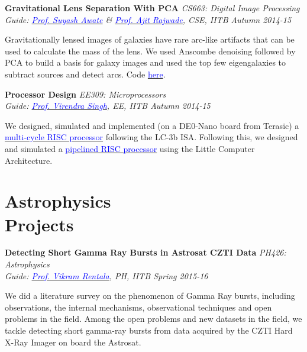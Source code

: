 \documentclass[margin,line]{res}
\newenvironment{list1}{
  \begin{list}{\ding{113}}{%
      \setlength{\itemsep}{0in}
      \setlength{\parsep}{0in} \setlength{\parskip}{0in}
      \setlength{\topsep}{0in} \setlength{\partopsep}{0in} 
      \setlength{\leftmargin}{0.17in}}}{\end{list}}
\begin{document}
\begin{resume}
\vspace*{-0.1in}

{\bf Gravitational Lens Separation With PCA} \hfill \textit{CS663: Digital Image Processing} \\
{\em Guide: \href{https://www.cse.iitb.ac.in/~suyash}{\textcolor{blue}{Prof. Suyash Awate}} \& \href{https://www.cse.iitb.ac.in/~ajitvr}{\textcolor{blue}{Prof. Ajit Rajwade}}, CSE, IITB \hfill Autumn 2014-15} \\
\vspace*{-.15in}
\begin{list1}
\item[] Gravitationally lensed images of galaxies have rare arc-like artifacts that can be used to calculate the mass of the lens. We used Anscombe denoising followed by PCA to build a basis for galaxy images and used the top few eigengalaxies to subtract sources and detect arcs. Code \href{https://github.com/alankarkotwal/pca-lens-finder}{\textcolor{blue} {here}}.
\end{list1}

\vspace*{-0.1in}

{\bf Processor Design} \hfill \textit{EE309: Microprocessors} \\
{\em Guide: \href{https://www.ee.iitb.ac.in/~viren/}{\textcolor{blue}{Prof. Virendra Singh}}, EE, IITB \hfill Autumn 2014-15} \\
\vspace*{-.15in}
\begin{list1}
\item[] We designed, simulated and implemented (on a DE0-Nano board from Terasic) a \href{https://github.com/alankarkotwal/lc-3b-processor}{\textcolor{blue} {multi-cycle RISC processor}} following the LC-3b ISA. Following this, we designed and simulated a \href{https://github.com/alankarkotwal/lca-processor}{\textcolor{blue} {pipelined RISC processor}} using the Little Computer Architecture.
\end{list1}

\section{\sc Astrophysics \\Projects}
{\bf Detecting Short Gamma Ray Bursts in Astrosat CZTI Data} \hfill \textit{PH426: Astrophysics} \\
{\em Guide: \href{https://sites.google.com/site/vikramrentalahome/}{\textcolor{blue}{Prof. Vikram Rentala}}, \textit{PH, IITB} \hfill Spring 2015-16} \\
\vspace*{-.15in}
\begin{list1}
\item[] We did a literature survey on the phenomenon of Gamma Ray bursts, including observations, the internal mechanisms, observational techniques and open problems in the field. Among the open problems and new datasets in the field, we tackle detecting short gamma-ray bursts from data acquired by the CZTI Hard X-Ray Imager on board the Astrosat.
\end{list1}


\end{resume}
\end{document}

